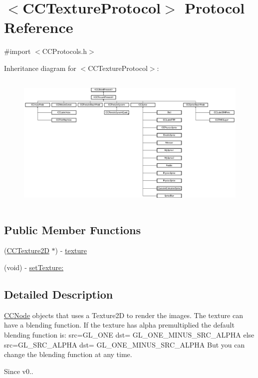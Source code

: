 \hypertarget{protocol_c_c_texture_protocol-p}{\section{$<$C\-C\-Texture\-Protocol$>$ Protocol Reference}
\label{protocol_c_c_texture_protocol-p}
}


{\ttfamily \#import $<$C\-C\-Protocols.\-h$>$}

Inheritance diagram for $<$C\-C\-Texture\-Protocol$>$\-:\begin{figure}[H]
\begin{center}
\leavevmode
\includegraphics[height=6.645569cm]{protocol_c_c_texture_protocol-p}
\end{center}
\end{figure}
\subsection*{Public Member Functions}
\begin{DoxyCompactItemize}
\item 
(\hyperlink{class_c_c_texture2_d}{C\-C\-Texture2\-D} $\ast$) -\/ \hyperlink{protocol_c_c_texture_protocol-p_a6d5ce4477e7ceee21c7d0cd3302c3730}{texture}
\item 
(void) -\/ \hyperlink{protocol_c_c_texture_protocol-p_ab4f1328a2f24c9859b41280d935eb75d}{set\-Texture\-:}
\end{DoxyCompactItemize}


\subsection{Detailed Description}
\hyperlink{class_c_c_node}{C\-C\-Node} objects that uses a Texture2\-D to render the images. The texture can have a blending function. If the texture has alpha premultiplied the default blending function is\-: src=G\-L\-\_\-\-O\-N\-E dst= G\-L\-\_\-\-O\-N\-E\-\_\-\-M\-I\-N\-U\-S\-\_\-\-S\-R\-C\-\_\-\-A\-L\-P\-H\-A else src=G\-L\-\_\-\-S\-R\-C\-\_\-\-A\-L\-P\-H\-A dst= G\-L\-\_\-\-O\-N\-E\-\_\-\-M\-I\-N\-U\-S\-\_\-\-S\-R\-C\-\_\-\-A\-L\-P\-H\-A But you can change the blending function at any time. \begin{DoxySince}{Since}
v0.. 
\end{DoxySince}


